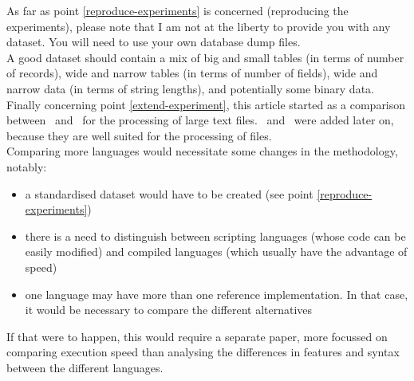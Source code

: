 As far as point \ref{reproduce-experiments} is concerned (reproducing the experiments), please note that I am not at the liberty to provide you with any dataset. You will need to use your own database dump files. \\

A good dataset should contain a mix of big and small tables (in terms of number of records), wide and narrow tables (in terms of number of fields), wide and narrow data (in terms of string lengths), and potentially some binary data. \\

Finally concerning point \ref{extend-experiment}, this article started as a comparison between \python\ and \awk\ for the processing of large text files. \perl\ and \julia\ were added later on, because they are well suited for the processing of files. \\

Comparing more languages would necessitate some changes in the methodology, notably:
\begin{itemize}
	\item a standardised dataset would have to be created (see point \ref{reproduce-experiments})
	\item there is a need to distinguish between scripting languages (whose code can be easily modified) and compiled languages (which usually have the advantage of speed)
	\item one language may have more than one reference implementation. In that case, it would be necessary to compare the different alternatives
\end{itemize}
If that were to happen, this would require a separate paper, more focussed on comparing execution speed than analysing the differences in features and syntax between the different languages. \\


